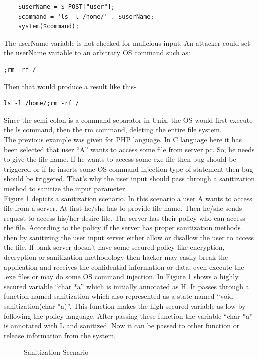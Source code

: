 \begin{lstlisting}
	$userName = $_POST["user"];
	$command = 'ls -l /home/' . $userName;
	system($command);
\end{lstlisting} 

The userName variable is not checked for malicious input. An attacker could set the userName variable to an arbitrary OS command such as:
\begin{lstlisting}
;rm -rf /
\end{lstlisting}
Then that would produce a result like this-
\begin{lstlisting}
ls -l /home/;rm -rf /
\end{lstlisting}
Since the semi-colon is a command separator in Unix, the OS would first execute the ls command, then the rm command, deleting the entire file system.\\

The previous example was given for PHP language. In C language here it has been selected that user \enquote{A} wants to access some file from server pc. So, he needs to give the file name. If he wants to access some exe file then bug should be triggered or if he inserts some OS command injection type of statement then bug should be triggered. That's why the user input should pass through a sanitization method to sanitize the input parameter.\\

 Figure \ref{sanitization_scenario} depicts a sanitization scenario. In this scenario a user A wants to access file from a server. At first he/she has to provide file name. Then he/she sends request to access his/her desire file. The server has their policy who can access the file. According to the policy if the server has proper sanitization methods then by sanitizing the user input server either allow or disallow the user to access the file. If bank server doesn't have some secured policy like encryption, decryption or sanitization methodology then hacker may easily break the application and receives the confidential information or data, even execute the .exe files or may do some OS command injection. In Figure \ref{sanitization_scenario} shows a highly secured variable \enquote{char *a} which is initially annotated as H. It passes through a function named sanitization which also represented as a state named \enquote{void sanitization(char *a)}. This function makes the high secured variable as low by following the policy language. After passing these function the variable \enquote{char *a} is annotated with L and sanitized. Now it can be passed to other function or release information from the system.

\begin{figure}[htbp]
	\centering
	\label{sanitization_scenario}
	\caption{Sanitization Scenario}
\end{figure}

